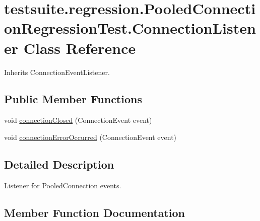 \hypertarget{classtestsuite_1_1regression_1_1_pooled_connection_regression_test_1_1_connection_listener}{}\section{testsuite.\+regression.\+Pooled\+Connection\+Regression\+Test.\+Connection\+Listener Class Reference}
\label{classtestsuite_1_1regression_1_1_pooled_connection_regression_test_1_1_connection_listener}


Inherits Connection\+Event\+Listener.

\subsection*{Public Member Functions}
\begin{DoxyCompactItemize}
\item 
void \mbox{\hyperlink{classtestsuite_1_1regression_1_1_pooled_connection_regression_test_1_1_connection_listener_ad3a7a8137c8631da7c590cf9ae14d632}{connection\+Closed}} (Connection\+Event event)
\item 
void \mbox{\hyperlink{classtestsuite_1_1regression_1_1_pooled_connection_regression_test_1_1_connection_listener_ad64bb73a2b6c66d5608528771c7f014a}{connection\+Error\+Occurred}} (Connection\+Event event)
\end{DoxyCompactItemize}


\subsection{Detailed Description}
Listener for Pooled\+Connection events. 

\subsection{Member Function Documentation}
\mbox{\label{classtestsuite_1_1regression_1_1_pooled_connection_regression_test_1_1_connection_listener_ad3a7a8137c8631da7c590cf9ae14d632}} 
